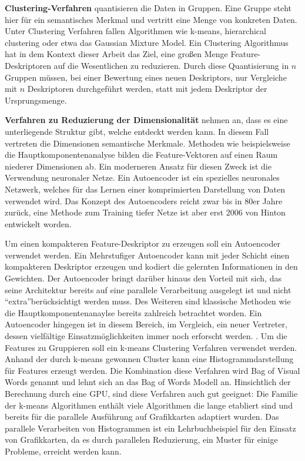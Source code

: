 \textbf{Clustering-Verfahren} quantisieren die Daten in Gruppen. Eine Gruppe steht hier für ein semantisches Merkmal und vertritt eine Menge von konkreten Daten. Unter Clustering Verfahren fallen Algorithmen wie k-means, hierarchical clustering oder etwa das Gaussian Mixture Model.\newline
Ein Clustering Algorithmus hat in dem Kontext dieser Arbeit das Ziel, eine großen Menge Feature-Deskriptoren auf die Wesentlichen zu reduzieren. Durch diese Quantisierung in $n$ Gruppen müssen, bei einer Bewertung eines neuen Deskriptors, nur Vergleiche mit $n$ Deskriptoren durchgeführt werden, statt mit jedem Deskriptor der Ursprungsmenge.\newline

\textbf{Verfahren zu Reduzierung der Dimensionalität} nehmen an, dass es eine unterliegende Struktur gibt, welche entdeckt werden kann. In diesem Fall vertreten die Dimensionen semantische Merkmale. Methoden wie beispielsweise die Hauptkomponentenanalyse bilden die Feature-Vektoren auf einen Raum niederer Dimensionen ab. \newline
Ein moderneren Ansatz für diesen Zweck ist die Verwendung neuronaler Netze. Ein Autoencoder ist ein spezielles neuronales Netzwerk, welches für das Lernen einer komprimierten Darstellung von Daten verwendet wird. Das Konzept des Autoencoders reicht zwar bis in 80er Jahre zurück, eine Methode zum Training tiefer Netze ist aber erst 2006 von Hinton entwickelt worden.\newline

Um einen kompakteren Feature-Deskriptor zu erzeugen soll ein Autoencoder verwendet werden. Ein Mehrstufiger Autoencoder kann mit jeder Schicht einen kompakteren Deskriptor erzeugen und kodiert die gelernten Informationen in den Gewichten. Der Autoencoder bringt darüber hinaus den Vorteil mit sich, das seine Architektur bereits auf eine parallele Verarbeitung ausgelegt ist und nicht \enquote{extra}berücksichtigt werden muss. Des Weiteren sind klassische Methoden wie die Hauptkomponentenanaylse bereits zahlreich betrachtet worden. Ein Autoencoder hingegen ist in diesem Bereich, im Vergleich, ein neuer Vertreter, dessen vielfältige Einsatzmöglichkeiten immer noch erforscht werden. . \newline  
Um die Features zu Gruppieren soll ein k-means Clustering Verfahren verwendet werden. Anhand der durch k-means gewonnen Cluster kann eine Histogrammdarstellung für Features erzeugt werden. Die Kombination diese Verfahren wird Bag of Visual Words genannt und lehnt sich an das Bag of Words Modell an. Hinsichtlich der Berechnung durch eine GPU, sind diese Verfahren auch gut geeignet: Die Familie der k-means Algorithmen enthält viele Algorithmen die lange etabliert sind und bereits für die parallele Ausführung auf Grafikkarten adaptiert wurden. Das parallele Verarbeiten von Histogrammen ist ein Lehrbuchbeispiel für den Einsatz von Grafikkarten, da es durch parallelen Reduzierung, ein Muster für einige Probleme, erreicht werden kann.

